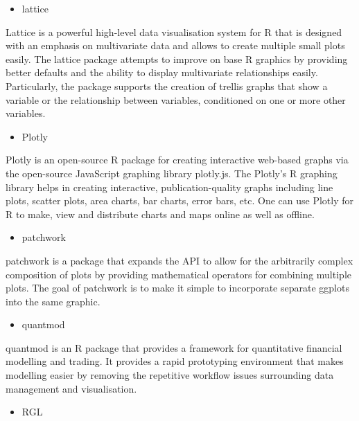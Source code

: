 \documentclass[
]{report}
\providecommand{\tightlist}{%
  \setlength{\itemsep}{0pt}\setlength{\parskip}{0pt}}
\begin{document}
\begin{itemize}
\tightlist
\item
  lattice
\end{itemize}

Lattice is a powerful high-level data visualisation system for R that is designed with an emphasis on multivariate data and allows to create multiple small plots easily. The lattice package attempts to improve on base R graphics by providing better defaults and the ability to display multivariate relationships easily. Particularly, the package supports the creation of trellis graphs that show a variable or the relationship between variables, conditioned on one or more other variables.

\begin{itemize}
\tightlist
\item
  Plotly
\end{itemize}

Plotly is an open-source R package for creating interactive web-based graphs via the open-source JavaScript graphing library plotly.js. The Plotly's R graphing library helps in creating interactive, publication-quality graphs including line plots, scatter plots, area charts, bar charts, error bars, etc. One can use Plotly for R to make, view and distribute charts and maps online as well as offline.

\begin{itemize}
\tightlist
\item
  patchwork
\end{itemize}

patchwork is a package that expands the API to allow for the arbitrarily complex composition of plots by providing mathematical operators for combining multiple plots. The goal of patchwork is to make it simple to incorporate separate ggplots into the same graphic.

\begin{itemize}
\tightlist
\item
  quantmod
\end{itemize}

quantmod is an R package that provides a framework for quantitative financial modelling and trading. It provides a rapid prototyping environment that makes modelling easier by removing the repetitive workflow issues surrounding data management and visualisation.

\begin{itemize}
\tightlist
\item
  RGL
\end{itemize}
\end{document}
